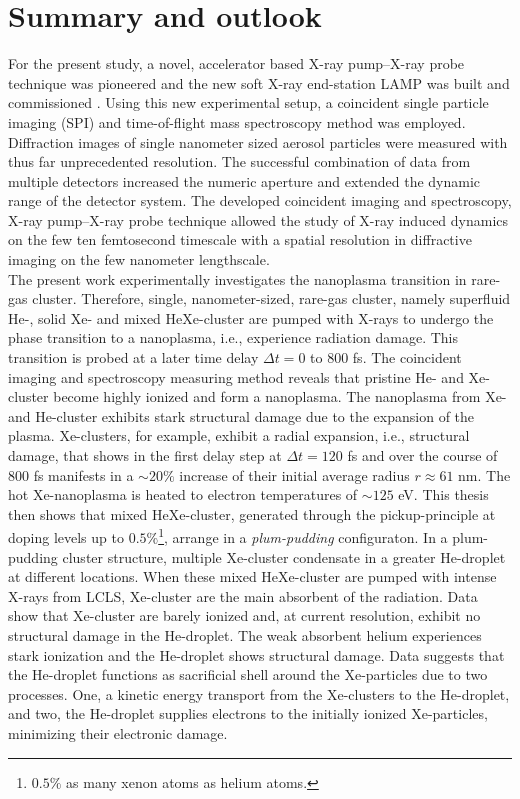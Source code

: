 \chapter{Summary and outlook}\label{ch:summary_outlook}
For the present study, a novel, accelerator based X-ray pump--X-ray probe technique was pioneered \citep{Lutman-2013-PRL} and the new soft X-ray end-station LAMP was built and commissioned \citep{Ferguson-2015-JSR}. Using this new experimental setup, a coincident single particle imaging (SPI) and time-of-flight mass spectroscopy method was employed. Diffraction images of single nanometer sized aerosol particles were measured with thus far unprecedented resolution. The successful combination of data from multiple detectors increased the numeric aperture and extended the dynamic range of the detector system. The developed coincident imaging and spectroscopy, X-ray pump--X-ray probe technique allowed the study of X-ray induced dynamics on the few ten femtosecond timescale with a spatial resolution in diffractive imaging on the few nanometer lengthscale.\\[1\baselineskip]
%
The present work experimentally investigates the nanoplasma transition in rare-gas cluster. Therefore, single, nanometer-sized, rare-gas cluster, namely superfluid He-, solid Xe- and mixed HeXe-cluster are pumped with X-rays to undergo the phase transition to a nanoplasma, i.e., experience radiation damage. This transition is probed at a later time delay $\Delta t=0$ to $800$ fs. The coincident imaging and spectroscopy measuring method reveals that pristine He- and Xe-cluster become highly ionized and form a nanoplasma. The nanoplasma from Xe- and He-cluster exhibits stark structural damage due to the expansion of the plasma. Xe-clusters, for example, exhibit a radial expansion, i.e., structural damage, that shows in the first delay step at $\Delta t = 120$ fs and over the course of 800 fs manifests in a $\sim 20 \%$ increase of their initial average radius $r\approx 61$ nm. The hot Xe-nanoplasma is heated to electron temperatures of $\sim 125$ eV. This thesis then shows that mixed HeXe-cluster, generated through the pickup-principle at doping levels up to $0.5\%$\footnote{$0.5\%$ as many xenon atoms as helium atoms.}, arrange in a \textit{plum-pudding} configuraton. In a plum-pudding cluster structure, multiple Xe-cluster condensate in a greater He-droplet at different locations. When these mixed HeXe-cluster are pumped with intense X-rays from LCLS, Xe-cluster are the main absorbent of the radiation. Data show that Xe-cluster are barely ionized and, at current resolution, exhibit no structural damage in the He-droplet. The weak absorbent helium experiences stark ionization and the He-droplet shows structural damage. Data suggests that the He-droplet functions as sacrificial shell around the Xe-particles due to two processes. One, a kinetic energy transport from the Xe-clusters to the He-droplet, and two, the He-droplet supplies electrons to the initially ionized Xe-particles, minimizing their electronic damage.\\[1\baselineskip]
